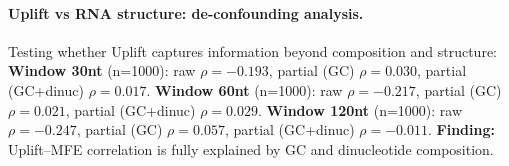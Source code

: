 \paragraph{Uplift vs RNA structure: de-confounding analysis.}
Testing whether Uplift captures information beyond composition and structure:
\textbf{Window 30nt} (n=1000): raw $\rho=-0.193$, partial (GC) $\rho=0.030$, partial (GC+dinuc) $\rho=0.017$.
\textbf{Window 60nt} (n=1000): raw $\rho=-0.217$, partial (GC) $\rho=0.021$, partial (GC+dinuc) $\rho=0.029$.
\textbf{Window 120nt} (n=1000): raw $\rho=-0.247$, partial (GC) $\rho=0.057$, partial (GC+dinuc) $\rho=-0.011$.
\textbf{Finding:} Uplift--MFE correlation is fully explained by GC and dinucleotide composition.
